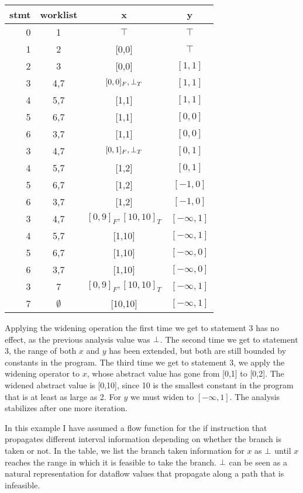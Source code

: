 \documentclass[11pt]{article}
\begin{document}
\begin{center}
\begin{tabular}{r | c | c c}

stmt & worklist & x & y \\
\hline
0  & 1   & $\top$ & $\top$ \\
1  & 2   & [0,0] & $\top$ \\
2  & 3   & [0,0] & $[1,1]$ \\
3  & 4,7 & $[0,0]_F, \bot_T$ & $[1,1]$ \\
4  & 5,7 & [1,1] & $[1,1]$ \\
5  & 6,7 & [1,1] & $[0,0]$ \\
6  & 3,7 & [1,1] & $[0,0]$ \\
3  & 4,7 & $[0,1]_F, \bot_T$ & $[0,1]$ \\
4  & 5,7 & [1,2] & $[0,1]$ \\
5  & 6,7 & [1,2] & $[-1,0]$ \\
6  & 3,7 & [1,2] & $[-1,0]$ \\
3  & 4,7 & $[0,9]_F,[10,10]_T$ & $[-\infty,1]$ \\
4  & 5,7 & [1,10] & $[-\infty,1]$ \\
5  & 6,7 & [1,10] & $[-\infty,0]$ \\
6  & 3,7 & [1,10] & $[-\infty,0]$ \\
3  & 7 & $[0,9]_F,[10,10]_T$ & $[-\infty,1]$ \\
7  & $\emptyset$ & [10,10] & $[-\infty,1]$ \\
\end{tabular}
\end{center}

Applying the widening operation the first time we get to statement 3 has no
effect, as the previous analysis value was $\bot$.  The second time we get to
statement 3, the range of both $x$ and $y$ has been extended, but both are still
bounded by constants in the program.  The third time we get to statement 3, we
apply the widening operator to $x$, whose abstract value has gone from [0,1] to
[0,2].  The widened abstract value is [0,10], since 10 is the smallest constant
in the program that is at least as large as 2.  For $y$ we must widen to
$[-\infty,1]$. The analysis stabilizes after one more iteration.

In this example I have assumed a flow function for the if instruction that
propagates different interval information depending on whether the branch is
taken or not.  In the table, we list the branch taken information for $x$ as
$\bot$ until $x$ reaches the range in which it is feasible to take the
branch.  $\bot$ can be seen as a natural representation for dataflow values
that propagate along a path that is infeasible.
\end{document}
